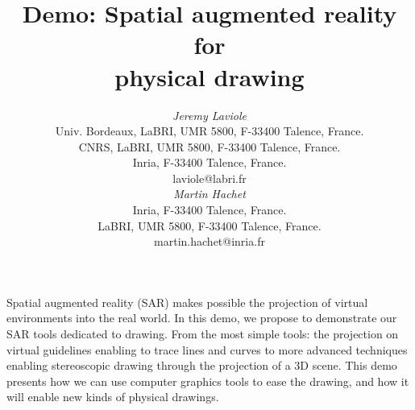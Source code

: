 \documentclass{article}
\begin{document}




\title{Demo: Spatial augmented reality for \\
       physical drawing}



\author{
\parbox[t]{9cm}{\centering
	     {\em Jeremy Laviole}\\
	     Univ. Bordeaux, LaBRI, UMR 5800, F-33400 Talence, France.\\
         CNRS, LaBRI, UMR 5800, F-33400 Talence, France.\\
	     Inria, F-33400 Talence, France.\\
	     laviole@labri.fr}
\parbox[t]{9cm}{\centering
	     {\em Martin Hachet}\\
	     Inria, F-33400 Talence, France.\\
	     LaBRI, UMR 5800, F-33400 Talence, France.\\
	     martin.hachet@inria.fr}
}


\maketitle

\abstract
Spatial augmented reality (SAR) makes possible the projection of virtual environments into the real world. In this demo, we propose to demonstrate our SAR tools dedicated to drawing. 
From the most simple tools: the projection on virtual guidelines enabling to trace lines and curves  to more advanced techniques enabling stereoscopic drawing through the projection of a 3D scene. This demo presents how we can use computer graphics tools to ease the drawing, and how it will enable new kinds of physical drawings. 
\end{document}
